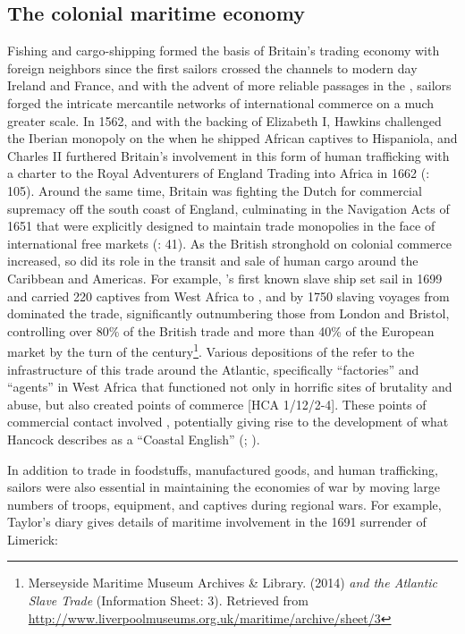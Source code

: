 \subsection{{The colonial maritime economy}}\label{sec:4.3.3}
\largerpage
  Fishing and cargo-shipping formed the basis of Britain’s trading economy with foreign neighbors since the first sailors crossed the channels to modern day Ireland and France, and with the advent of more reliable  passages in the , sailors forged the intricate mercantile networks of international commerce on a much greater scale. In {1562}, and with the backing of Elizabeth I, Hawkins challenged the Iberian monopoly on the  when he shipped African captives to Hispaniola, and Charles II furthered Britain’s involvement in this form of human trafficking with a charter to the Royal Adventurers of England Trading into Africa in 1662 (\citealt{Brown2011}: 105). Around the same time, Britain was fighting the Dutch for commercial supremacy off the south coast of England, culminating in the Navigation Acts of 1651 that were explicitly designed to maintain trade monopolies in the face of international free markets (\citealt{Brown2011}: 41). As the British stronghold on colonial commerce increased, so did its role in the transit and sale of human cargo around the Caribbean and Americas. For example, ’s first known slave ship set sail in 1699 and carried 220 captives from West Africa to , and by 1750 slaving voyages from  dominated the trade, significantly outnumbering those from London and Bristol, controlling over 80\% of the British trade and more than 40\% of the European market by the turn of the century\footnote{Merseyside Maritime Museum Archives \& Library. (2014) \textit{ and the Atlantic Slave Trade} (Information Sheet: 3). Retrieved from \url{http://www.liverpoolmuseums.org.uk/maritime/archive/sheet/3}}. 
  Various depositions of the  refer to the infrastructure of this trade around the Atlantic, specifically “factories” and “agents” in West Africa that functioned not only in horrific sites of brutality and abuse, but also created points of commerce [HCA 1/12/2-4]. These points of commercial contact involved , potentially giving rise to the development of what Hancock describes as a “Coastal English” (\citealt{Hancock1986}; \citealt{DelgadoHancock2017}).

In addition to trade in foodstuffs, manufactured goods, and human trafficking, sailors were also essential in maintaining the economies of war by moving large numbers of troops, equipment, and captives during regional wars. For example, Taylor’s diary gives details of maritime involvement in the 1691 surrender of Limerick:

